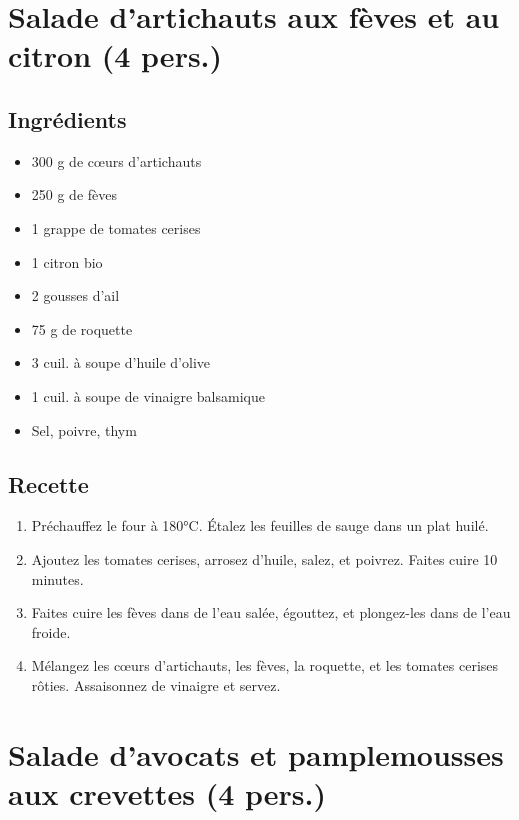 \section{Salade d'artichauts aux fèves et au citron (4
pers.)}\label{salade-dartichauts-aux-fuxe8ves-et-au-citron-4-pers.}

\subsection{Ingrédients}\label{ingruxe9dients-13}

\begin{itemize}

\item
  300 g de cœurs d'artichauts
\item
  250 g de fèves
\item
  1 grappe de tomates cerises
\item
  1 citron bio
\item
  2 gousses d'ail
\item
  75 g de roquette
\item
  3 cuil. à soupe d'huile d'olive
\item
  1 cuil. à soupe de vinaigre balsamique
\item
  Sel, poivre, thym
\end{itemize}

\subsection{Recette}\label{recette-8}

\begin{enumerate}
\def\labelenumi{\arabic{enumi}.}

\item
  Préchauffez le four à 180°C. Étalez les feuilles de sauge dans un plat
  huilé.
\item
  Ajoutez les tomates cerises, arrosez d'huile, salez, et poivrez.
  Faites cuire 10 minutes.
\item
  Faites cuire les fèves dans de l'eau salée, égouttez, et plongez-les
  dans de l'eau froide.
\item
  Mélangez les cœurs d'artichauts, les fèves, la roquette, et les
  tomates cerises rôties. Assaisonnez de vinaigre et servez.
\end{enumerate}

\section{Salade d'avocats et pamplemousses aux crevettes (4
pers.)}\label{salade-davocats-et-pamplemousses-aux-crevettes-4-pers.}

